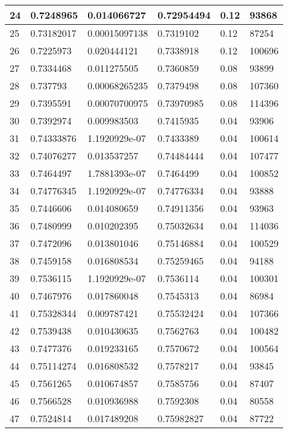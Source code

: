 \begin{longtable}{|l|l|l|l|l|l|}
24 & 0.7248965 & 0.014066727 & 0.72954494 & 0.12 & 93868 \\ \hline 
25 & 0.73182017 & 0.00015097138 & 0.7319102 & 0.12 & 87254 \\ \hline 
26 & 0.7225973 & 0.020444121 & 0.7338918 & 0.12 & 100696 \\ \hline 
27 & 0.7334468 & 0.011275505 & 0.7360859 & 0.08 & 93899 \\ \hline 
28 & 0.737793 & 0.00068265235 & 0.7379498 & 0.08 & 107360 \\ \hline 
29 & 0.7395591 & 0.00070700975 & 0.73970985 & 0.08 & 114396 \\ \hline 
30 & 0.7392974 & 0.009983503 & 0.7415935 & 0.04 & 93906 \\ \hline 
31 & 0.74333876 & 1.1920929e-07 & 0.7433389 & 0.04 & 100614 \\ \hline 
32 & 0.74076277 & 0.013537257 & 0.74484444 & 0.04 & 107477 \\ \hline 
33 & 0.7464497 & 1.7881393e-07 & 0.7464499 & 0.04 & 100852 \\ \hline 
34 & 0.74776345 & 1.1920929e-07 & 0.74776334 & 0.04 & 93888 \\ \hline 
35 & 0.7446606 & 0.014080659 & 0.74911356 & 0.04 & 93963 \\ \hline 
36 & 0.7480999 & 0.010202395 & 0.75032634 & 0.04 & 114036 \\ \hline 
37 & 0.7472096 & 0.013801046 & 0.75146884 & 0.04 & 100529 \\ \hline 
38 & 0.7459158 & 0.016808534 & 0.75259465 & 0.04 & 94188 \\ \hline 
39 & 0.7536115 & 1.1920929e-07 & 0.7536114 & 0.04 & 100301 \\ \hline 
40 & 0.7467976 & 0.017860048 & 0.7545313 & 0.04 & 86984 \\ \hline 
41 & 0.75328344 & 0.009787421 & 0.75532424 & 0.04 & 107366 \\ \hline 
42 & 0.7539438 & 0.010430635 & 0.7562763 & 0.04 & 100482 \\ \hline 
43 & 0.7477376 & 0.019233165 & 0.7570672 & 0.04 & 100564 \\ \hline 
44 & 0.75114274 & 0.016808532 & 0.7578217 & 0.04 & 93845 \\ \hline 
45 & 0.7561265 & 0.010674857 & 0.7585756 & 0.04 & 87407 \\ \hline 
46 & 0.7566528 & 0.010936988 & 0.7592308 & 0.04 & 80558 \\ \hline 
47 & 0.7524814 & 0.017489208 & 0.75982827 & 0.04 & 87722 \\ \hline 

\end{longtable}

